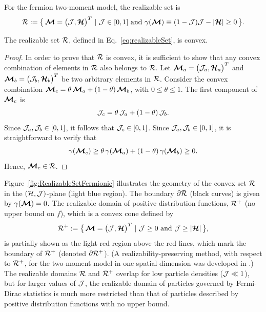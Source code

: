 \begin{define}
  For the fermion two-moment model, the realizable set is
  \begin{equation}
    \mathcal{R}:=\big\{\,\boldsymbol{\mathcal{M}}=\big(\mathcal{J},\boldsymbol{\mathcal{H}}\big)^{T}~|~\mathcal{J}\in[0,1]~\text{and}~\gamma(\boldsymbol{\mathcal{M}})\equiv(1-\mathcal{J})\mathcal{J}-|\boldsymbol{\mathcal{H}}|\ge0\,\big\}.
    \label{eq:realizableSet}
  \end{equation}
\end{define}

\begin{lemma}
  The realizable set $\mathcal{R}$, defined in Eq.~\eqref{eq:realizableSet}, is convex.  
\end{lemma}
\begin{proof}
  In order to prove that $\mathcal{R}$ is convex, it is sufficient to show that any convex combination of elements in $\mathcal{R}$ also belongs to $\mathcal{R}$.  
  Let $\boldsymbol{\mathcal{M}}_{a}=\big(\mathcal{J}_{a},\boldsymbol{\mathcal{H}}_{a}\big)^{T}$ and $\boldsymbol{\mathcal{M}}_{b}=\big(\mathcal{J}_{b},\boldsymbol{\mathcal{H}}_{b}\big)^{T}$ be two arbitrary elements in $\mathcal{R}$.  
  Consider the convex combination $\boldsymbol{\mathcal{M}}_{c} = \theta\,\boldsymbol{\mathcal{M}}_{a} + (1-\theta)\,\boldsymbol{\mathcal{M}}_{b}$, with $0\leq\theta\leq1$.
  The first component of $\boldsymbol{\mathcal{M}}_{c}$ is
  \begin{equation*}
    \mathcal{J}_{c} = \theta\,\mathcal{J}_{a} + (1-\theta)\,\mathcal{J}_{b}.
  \end{equation*}
  Since $\mathcal{J}_{a},\mathcal{J}_{b}\in[0,1]$, it follows that $\mathcal{J}_{c} \in [0,1]$.  
  Since $\mathcal{J}_{a},\mathcal{J}_{b}\in[0,1]$, it is straightforward to verify that
  \begin{equation*}
  \gamma(\boldsymbol{\mathcal{M}}_{c}) \geq \theta\,\gamma(\boldsymbol{\mathcal{M}}_{a}) + (1-\theta)\,\gamma(\boldsymbol{\mathcal{M}}_{b}) \ge0.
  \end{equation*}
  Hence, $\boldsymbol{\mathcal{M}}_{c}\in\mathcal{R}$.
\end{proof}

Figure~\ref{fig:RealizableSetFermionic} illustrates the geometry of the convex set $\mathcal{R}$ in the $(\mathcal{H},\mathcal{J})$-plane (light blue region).  
The boundary $\partial\mathcal{R}$ (black curves) is given by $\gamma(\boldsymbol{\mathcal{M}})=0$.  
The realizable domain of positive distribution functions, $\mathcal{R}^{+}$ (no upper bound on $f$), which is a convex cone defined by
\begin{equation}
  \mathcal{R}^{+}:=\big\{\,\boldsymbol{\mathcal{M}}=\big(\mathcal{J},\boldsymbol{\mathcal{H}}\big)^{T}~|~\mathcal{J}\ge0~\text{and}~\mathcal{J}\ge|\boldsymbol{\mathcal{H}}|\,\big\}, 
  \label{eq:realizableSetPositive}
\end{equation}
is partially shown as the light red region above the red lines, which mark the boundary of $\mathcal{R}^{+}$ (denoted $\partial\mathcal{R}^{+}$).  
(A realizability-preserving method, with respect to $\mathcal{R}^{+}$, for the two-moment model in one spatial dimension was developed in \cite{olbrant_etal_2012}.)  
The realizable domains $\mathcal{R}$ and $\mathcal{R}^{+}$ overlap for low particle densities ($\mathcal{J}\ll1$), but for larger values of $\mathcal{J}$, the realizable domain of particles governed by Fermi-Dirac statistics is much more restricted than that of particles described by positive distribution functions with no upper bound.  

